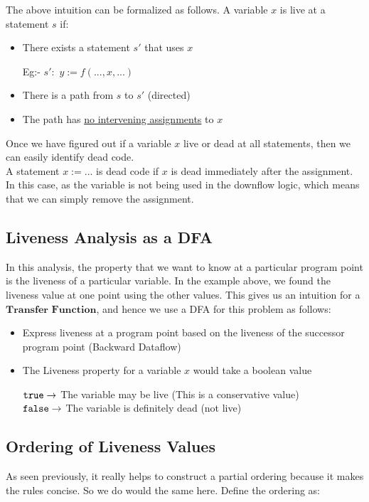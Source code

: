 \vspace{0.3cm}
The above intuition can be formalized as follows. A variable $x$ is live at a statement $s$ if:
\begin{itemize}
    \item There exists a statement $s'$ that uses $x$
    
    Eg:- $s':$ $y := f(...,x,...)$
    \item There is a path from $s$ to $s'$ (directed)
    \item The path has \underline{no intervening assignments} to $x$
\end{itemize}

Once we have figured out if a variable $x$ live or dead at all statements, then we can easily identify dead code.\\
A statement $x := ...$ is dead code if $x$ is dead immediately after the assignment.
In this case, as the variable is not being used in the downflow logic, which means that we can simply remove the assignment.

\subsection{Liveness Analysis as a DFA}
In this analysis, the property that we want to know at a particular program point is the liveness of a particular variable. In the example above, we found the liveness value at one point using the other values.
This gives us an intuition for a $\textbf{Transfer Function}$, and hence we use a DFA for this problem as follows:
\begin{itemize}
    \item Express liveness at a program point based on the liveness of the successor program point (Backward Dataflow)
    \item The Liveness property for a variable $x$ would take a boolean value
    
    \hspace*{0.1 in}${\tt true} \rightarrow$ The variable may be live (This is a conservative value)\\ 
    \hspace*{0.1 in}${\tt false} \rightarrow$ The variable is definitely dead (not live)
\end{itemize}

\subsection{Ordering of Liveness Values}
As seen previously, it really helps to construct a partial ordering because it makes the rules concise. So we do would the same here. Define the ordering as:

